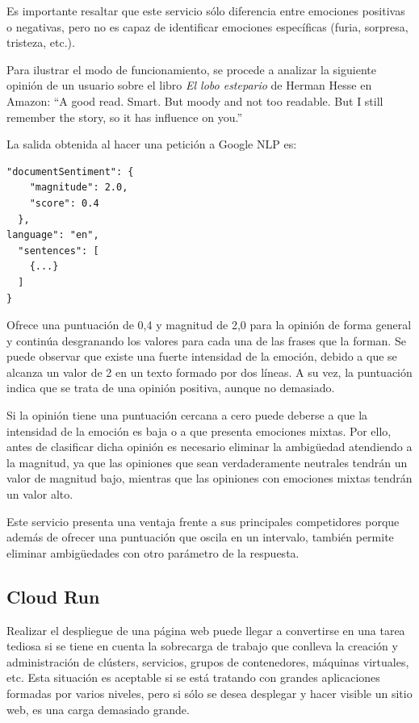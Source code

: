 Es importante resaltar que este servicio sólo diferencia entre emociones positivas o negativas, pero no es capaz de identificar emociones específicas (furia, sorpresa, tristeza, etc.). 

Para ilustrar el modo de funcionamiento, se procede a analizar la siguiente opinión de un usuario sobre el libro \textit{El lobo estepario} de Herman Hesse en Amazon: “A good read. Smart. But moody and not too readable. But I still remember the story, so it has influence on you.”

\newpage

La salida obtenida al hacer una petición a Google NLP es:

\begin{lstlisting}[caption=Ejemplo de respuesta API NLP ]
"documentSentiment": {
    "magnitude": 2.0,
    "score": 0.4
  },
language": "en",
  "sentences": [
    {...}
  ]
}
\end{lstlisting}

Ofrece una puntuación de 0,4  y magnitud de 2,0 para la opinión de forma general y continúa desgranando los valores para cada una de las frases que la forman. Se puede observar que existe una fuerte intensidad de la emoción, debido a que se alcanza un valor de 2 en un texto formado por dos líneas. A su vez, la puntuación indica que se trata de una opinión positiva, aunque no demasiado.

Si la opinión tiene una puntuación cercana a cero puede deberse a que la intensidad de la emoción es baja o a que presenta emociones mixtas. Por ello, antes de clasificar dicha opinión es necesario eliminar la ambigüedad atendiendo a la magnitud, ya que las opiniones que sean verdaderamente neutrales tendrán un valor de magnitud bajo, mientras que las opiniones con emociones mixtas tendrán un valor alto.

Este servicio presenta una ventaja frente a sus principales competidores porque además de ofrecer una puntuación que oscila en un intervalo, también permite eliminar ambigüedades con otro parámetro de la respuesta.

\subsection{Cloud Run}

Realizar el despliegue de una página web puede llegar a convertirse en una tarea tediosa si se tiene en cuenta la sobrecarga de trabajo que conlleva la creación y administración de clústers, servicios, grupos de contenedores, máquinas virtuales, etc. Esta situación es aceptable si se está tratando con grandes aplicaciones formadas por varios niveles, pero si sólo se desea desplegar y hacer visible un sitio web, es una carga demasiado grande.

